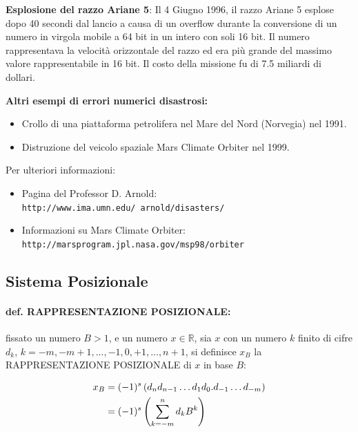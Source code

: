 \documentclass[a4paper, 11pt]{article}
\begin{document}
            \textbf{Esplosione del razzo Ariane 5}: Il 4 Giugno 1996, il razzo Ariane 5 esplose dopo 40 secondi dal lancio a causa di un overflow durante la conversione di un numero in virgola mobile a 64 bit in un intero con soli 16 bit. Il numero rappresentava la velocità orizzontale del razzo ed era più grande del massimo valore rappresentabile in 16 bit. Il costo della missione fu di 7.5 miliardi di dollari.


            \textbf{Altri esempi di errori numerici disastrosi:}
            \begin{itemize}
                \item Crollo di una piattaforma petrolifera nel Mare del Nord (Norvegia) nel 1991.
                \item Distruzione del veicolo spaziale Mars Climate Orbiter nel 1999.
            \end{itemize}

            Per ulteriori informazioni:
            \begin{itemize}
                \item Pagina del Professor D. Arnold: \texttt{http://www.ima.umn.edu/~arnold/disasters/}
                \item Informazioni su Mars Climate Orbiter: \texttt{http://marsprogram.jpl.nasa.gov/msp98/orbiter}
            \end{itemize}



        \subsection{Sistema Posizionale}

            \paragraph{def. RAPPRESENTAZIONE POSIZIONALE: }
            fissato un numero $B > 1$, e un numero $x \in \mathbb{R}$, sia $x$ con un numero $k$ finito di cifre $d_k$, $k = -m, -m+1,..., -1,0, +1,..., n+1$, si definisce $x_B$ la RAPPRESENTAZIONE POSIZIONALE di $x$ in base $B$:



            \begin{align}
                x_B &= (-1)^s \left( d_n d_{n-1} \dots d_1 d_0.d_{-1} \dots d_{-m} \right) \notag \\
                    &= (-1)^s \left( \sum_{k=-m}^{n} d_k B^k \right) \notag
            \end{align}
\end{document}
